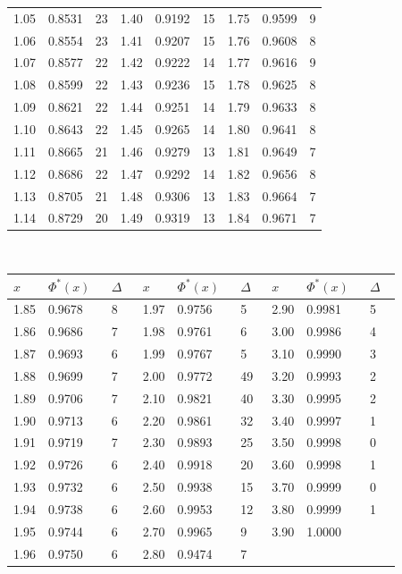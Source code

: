 \documentclass[russian, 12pt, fleqn,x11names]{article}
\begin{document}
\begin{center}
\begin{tabular}[b]{ | l | l | l || l | l | l || l |  l |  l |  }
1.05&0.8531&23&1.40&0.9192&15 &1.75 &0.9599&9 \\%
1.06&0.8554&23&1.41&0.9207&15   &1.76 &0.9608 &8 \\%
1.07&0.8577&22&1.42&0.9222&14   &1.77 &0.9616 & 9\\%
1.08&0.8599&22&1.43&0.9236&15   &1.78 &0.9625 & 8\\%
1.09&0.8621&22&1.44&0.9251&14   &1.79 &0.9633 & 8\\%

1.10&0.8643&22&1.45&0.9265&14   &1.80 &0.9641 & 8\\%
1.11&0.8665&21&1.46&0.9279&13   &1.81 &0.9649 & 7\\%
1.12&0.8686&22&1.47&0.9292&14   &1.82 &0.9656 & 8\\%
1.13&0.8705&21&1.48&0.9306&13   &1.83 &0.9664 & 7\\%
1.14&0.8729&20&1.49&0.9319&13   &1.84 &0.9671 & 7 \\%
\hline
\end{tabular}\\
\end{center}
\newpage
\begin{center}
\begin{tabular}[b]{ | l | l | l || l | l | l || l |  l |  l |  }
\hline
$x\ \ \ \ \ $&$\Phi^*(x)\ \ \ $&$\Delta\ \ \ $&$x\ \ \ \ \ $&$\Phi^*(x)\ \ \ $&$\Delta\ \ \ $&$x\ \ \ \ \ $&$\Phi^*(x)\ \ \ $&$\Delta\ \ \ $\\
\hline
1.85&0.9678&8&1.97&0.9756&5&2.90&0.9981&5\\%
1.86&0.9686&7&1.98&0.9761&6&3.00&0.9986&4\\%
1.87&0.9693&6&1.99&0.9767&5&3.10&0.9990&3\\%
1.88&0.9699&7&2.00&0.9772&49&3.20&0.9993&2\\%
1.89&0.9706&7&2.10&0.9821&40&3.30&0.9995&2\\%

1.90&0.9713&6&2.20&0.9861&32&3.40&0.9997&1\\%
1.91&0.9719&7&2.30&0.9893&25&3.50&0.9998&0\\%
1.92&0.9726&6&2.40&0.9918&20&3.60&0.9998&1\\%
1.93&0.9732&6&2.50&0.9938&15&3.70&0.9999&0\\%
1.94&0.9738&6&2.60&0.9953&12&3.80&0.9999&1\\%

1.95&0.9744&6&2.70&0.9965&9&3.90&1.0000&   \\%
1.96&0.9750&6&2.80&0.9474&7&       &           &    \\%
\hline
\end{tabular}\\
\end{center}
\end{document}

